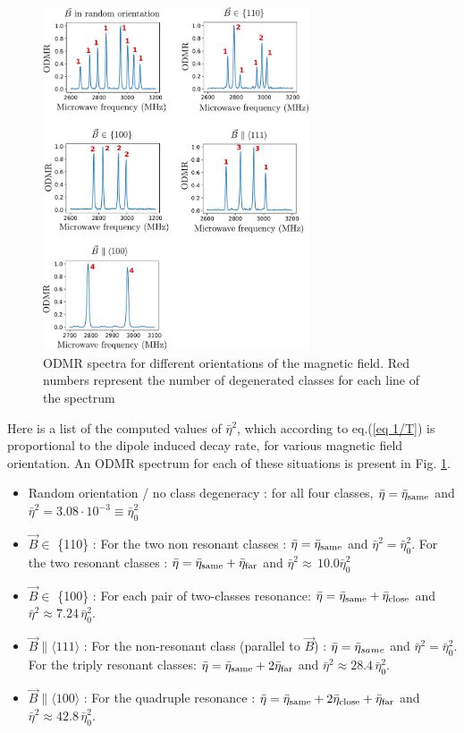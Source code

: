 \documentclass[preprintnumbers,amsmath,amssymb,onecolumn,12pt]{revtex4-2}
\begin{document}
\begin{figure}
\includegraphics[width=0.7\textwidth]{Figures_SI/Various ESR}
\caption{ODMR spectra for different orientations of the magnetic field. Red numbers represent the number of degenerated classes for each line of the spectrum}
\label{Various ODMR}
\end{figure}

Here is a list of the computed values of $\bar \eta^2$, which according to eq.(\ref{eq 1/T}) is proportional to the dipole induced decay rate, for various magnetic field orientation. An ODMR spectrum for each of these situations is present in Fig. \ref{Various ODMR}.
\begin{itemize}
\item Random orientation / no class degeneracy : for all four classes, $\bar \eta = \bar {\eta}_{\rm same}$ and $\bar \eta^2=3.08 \cdot 10^{-3} \equiv \bar \eta_0^2$
\item $\vec{B} \in$ \{110\} : For the two non resonant classes : $\bar \eta = \bar {\eta}_{\rm same}$ and $\bar \eta^2= \bar \eta_0^2$.  For the two resonant classes : $\bar \eta = \bar {\eta}_{\rm same} + \bar {\eta}_{\rm far}$ and $\bar \eta^2\approx\, 10.0 \bar \eta_0^2$
\item $\vec{B} \in$ \{100\} : For each pair of two-classes resonance: $\bar \eta = \bar {\eta}_{\rm same}+\bar {\eta}_{\rm close}$ and $\bar \eta^2\approx 7.24\, \bar \eta_0^2$. 
\item $\vec{B} \parallel \langle 111 \rangle$ : For the non-resonant class (parallel to $\vec B$) : $\bar \eta = \bar {\rm \eta}_{same}$ and $\bar \eta^2= \bar \eta_0^2$. For the triply resonant classes: $\bar \eta = \bar {\eta}_{\rm same}+2\bar {\eta}_{\rm far}$ and $\bar \eta^2\approx 28.4\, \bar \eta_0^2$. 
\item $\vec{B} \parallel \langle 100 \rangle$ : For the quadruple resonance : $\bar \eta = \bar {\eta}_{\rm same}+2\bar {\eta}_{\rm close} + \bar {\eta}_{\rm far}$  and $\bar \eta^2\approx 42.8\, \bar \eta_0^2$.
\end{itemize}
\end{document}
